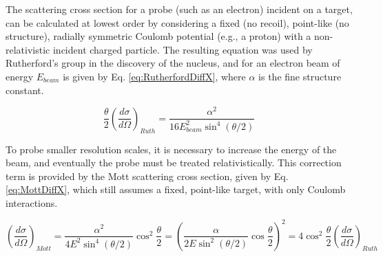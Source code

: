         
        

        


        The scattering cross section for a probe (such as an electron) incident on a target, can be calculated at lowest order by considering a fixed (no recoil), point-like (no structure),  radially symmetric Coulomb potential (e.g., a proton) with a non-relativistic incident charged particle. The resulting equation was used by Rutherford's group in the discovery of the nucleus, and for an electron beam of energy  $E_{beam}$ is given by Eq. \ref{eq:RutherfordDiffX}, where $\alpha$ is the fine structure constant.

            \begin{equation}\label{eq:RutherfordDiffX}
                {\frac{\theta}{2}}(\frac{d\sigma}{d\Omega})_{Ruth} = \frac{\alpha^2}{16E^2_{beam}\sin^4{(\theta/2)}}
            \end{equation}

        To probe smaller resolution scales, it is necessary to increase the energy of the beam, and eventually the probe must be treated relativistically. This correction term is provided by the Mott scattering cross section, given by Eq. \ref{eq:MottDiffX}, which still assumes a fixed, point-like target, with only Coulomb interactions.
            
                \begin{equation}\label{eq:MottDiffX}
                     (\frac{d\sigma}{d\Omega})_{Mott} = \frac{\alpha^2}{4E^2\sin^4{(\theta/2)}}\cos^2{\frac{\theta}{2}} = \left( \frac{\alpha}{2E\sin^2{(\theta/2)}}\cos{\frac{\theta}{2}} \right)^2 = 4\cos^2{\frac{\theta}{2}}(\frac{d\sigma}{d\Omega})_{Ruth}
                \end{equation}
        
